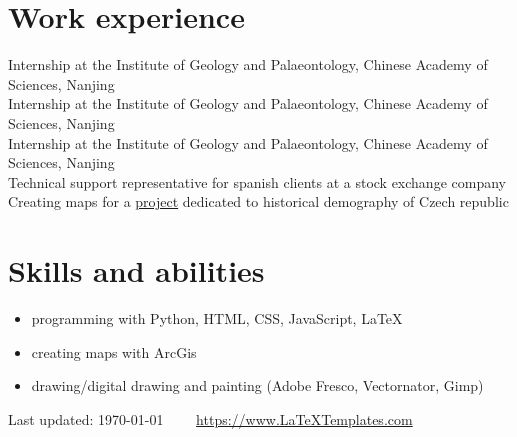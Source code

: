 \documentclass[11pt]{article} %
\begin{document}

\section*{Work experience}
 Internship at the Institute of Geology and Palaeontology, Chinese Academy of Sciences, Nanjing \\
 Internship at the Institute of Geology and Palaeontology, Chinese Academy of Sciences, Nanjing \\
 Internship at the Institute of Geology and Palaeontology, Chinese Academy of Sciences, Nanjing \\
 Technical support representative for spanish clients at a stock exchange company \\
 Creating maps for a \href{http://www.zaniklekrajiny.cz}{project} dedicated to historical demography of Czech republic


\section*{Skills and abilities}

\begin{multicols}{2}
\begin{itemize}
\itemsep -0.5em
\item programming with Python, HTML, CSS, JavaScript, \LaTeX 
\item creating maps with ArcGis 
\item drawing/digital drawing and painting (Adobe Fresco, Vectornator, Gimp) 
	
\end{itemize}
\end{multicols}
	\begin{barchart}{5.5}

\end{barchart}

\vfill %


\begin{center}
	\scriptsize
	Last updated: \today~~\raisebox{-0.5pt}{\textbullet}~~ \href{https://www.LaTeXTemplates.com}{https://www.LaTeXTemplates.com}
\end{center}

\end{document}
